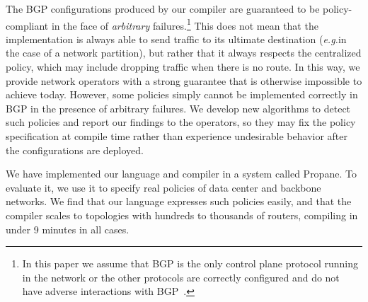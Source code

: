 \documentclass[10pt]{sigalternate052015}
\newcommand{\dpw}[1]{\textcolor{tmlblue}{[dpw: #1]}}
\newcommand{\EG}{\emph{e.g.}}
\newcommand{\sysname}{{\small \sf Propane}\xspace}
\begin{document}
The BGP configurations produced by our compiler are
guaranteed to be policy-compliant in the face of
{\em arbitrary} failures.\footnote{In this paper we assume that BGP is the only control plane protocol running in the network or the other protocols are correctly configured and do not have adverse interactions with BGP~\cite{igp-correctness1,igp-correctness2}.} This does not mean that the implementation is always
able to send traffic to its ultimate destination
(\EG in the case of a network partition), but rather that it always respects the
centralized policy, which may include dropping traffic when there is no route.
%
In this way, we provide network operators
with a strong guarantee that is otherwise impossible to achieve
today.
However, some policies simply cannot be implemented correctly in BGP in
 the presence of arbitrary failures.  We develop new
algorithms to detect such policies
and report our findings to the operators, so they may fix the policy
specification at compile time rather than experience undesirable
behavior after the configurations are deployed.


We have implemented our language and compiler in a system called \sysname. To evaluate it, we use it to specify real policies of data center and backbone networks.
We find that our language expresses such policies easily, and that the compiler scales to topologies with hundreds to thousands of routers, compiling in under 9 minutes in all cases.

%
\end{document}
